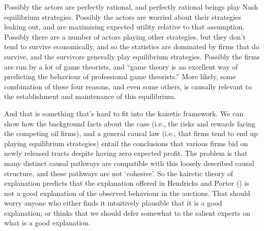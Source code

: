 \documentclass[
  11pt,
  letterpaper,
  DIV=11,
  numbers=noendperiod,
  oneside]{scrartcl}
\begin{document}
Possibly the actors are perfectly rational, and perfectly rational
beings play Nash equilibrium strategies. Possibly the actors are worried
about their strategies leaking out, and are maximising expected utility
relative to that assumption. Possibly there are a number of actors playing other
strategies, but they don't tend to survive economically, and so the
statistics are dominated by firms that do survive, and the survivors
generally play equilibrium strategies.
Possibly the firms are run by a lot of game theorists, and ``game theory
is an excellent way of predicting the behaviour of professional game
theorists.''
More likely, some combination of these four reasons, and even some
others, is causally relevant to the establishment and maintenance of
this equilibrium.

And that is something that's hard to fit into the kairetic framework. We
can show how the background facts about the case (i.e., the risks and
rewards facing the competing oil firms), and a general causal law (i.e.,
that firms tend to end up playing equilibrium strategies) entail the
conclusions that various firms bid on newly released tracts despite
having zero expected profit. The problem is that many distinct causal
pathways are compatible with this loosely described causal structure,
and these pathways are not `cohesive'. So the kairetic theory of
explanation predicts that the explanation offered in Hendricks and
Porter () is not a good
explanation of the observed behaviour in the auctions. That should worry
anyone who either finds it intuitively plausible that it is a good
explanation, or thinks that we should defer somewhat to the salient
experts on what is a good explanation.
\end{document}
